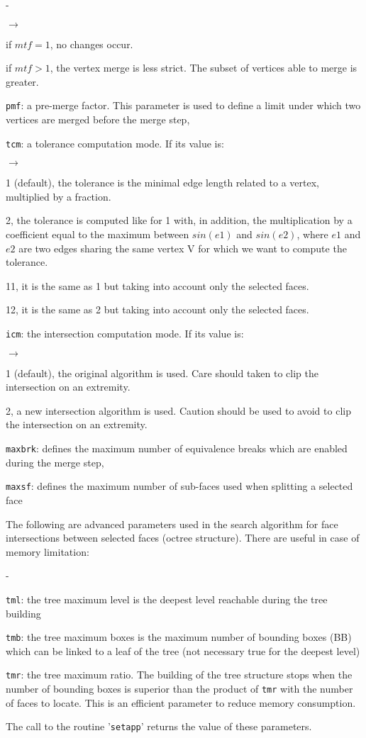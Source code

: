 {{{\begin{list}{-}{}
\begin{list}{$\rightarrow$}{}
\item if $mtf=1$, no changes occur.
\item if $mtf>1$, the vertex merge is less strict. The subset of vertices able to merge is greater.
\end{list}
\item \texttt{pmf}: a pre-merge factor. This parameter is used to define a limit under which two vertices are merged before the merge step,
\item \texttt{tcm}: a tolerance computation mode. If its value is:
\begin{list}{$\rightarrow$}{}
\item 1 (default), the tolerance is the minimal edge length related to a vertex, multiplied by a fraction.
\item 2, the tolerance is computed like for 1 with, in addition, the multiplication by a coefficient equal to the maximum between $sin(e1)$ and $sin(e2)$, where $e1$ and $e2$ are two edges sharing the same vertex V for which we want to compute the tolerance.
\item 11, it is the same as 1 but taking into account only the selected faces.
\item 12, it is the same as 2 but taking into account only the selected faces.
\end{list}
\item \texttt{icm}: the intersection computation mode. If its value is:
\begin{list}{$\rightarrow$}{}
\item 1 (default), the original algorithm is used. Care should taken to clip the intersection on an extremity.
\item 2, a new intersection algorithm is used. Caution should be used to avoid to clip the intersection on an extremity.
\end{list}
\item \texttt{maxbrk}: defines the maximum number of equivalence breaks which are enabled during the merge step,
\item \texttt{maxsf}: defines the maximum number of sub-faces used when splitting a selected face
\end{list}
%
The following are advanced parameters used in the search algorithm for face intersections between selected faces (octree structure). There are useful in case of memory limitation:
\begin{list}{-}{}
\item \texttt{tml}: the tree maximum level is the deepest level reachable during the tree building
\item \texttt{tmb}: the tree maximum boxes is the maximum number of bounding boxes (BB) which can be linked to a leaf of the tree (not necessary true for the deepest level)
\item \texttt{tmr}: the tree maximum ratio. The building of the tree structure stops when the number of bounding boxes is superior than the product of \texttt{tmr} with the number of faces to locate. This is an efficient parameter to reduce memory consumption.
\end{list}
The call to the routine '\texttt{setapp}' returns the value of these parameters.

}}}
